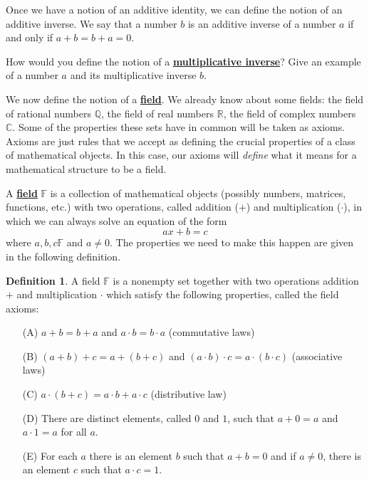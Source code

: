 \documentclass[11pt]{article}
\newenvironment{task}
	{\begin{mdframed}[linecolor=lightgray, linewidth=3pt]\raggedright}
	{\end{mdframed}}
\renewcommand\emph[1]{\underline{\bf{#1}}} %
\theoremstyle{definition}
\newtheorem{definition}[theorem]{Definition}
\begin{document}
Once we have a notion of an additive identity, we can define the notion of an additive inverse. We say that 
a number $b$ is an additive inverse of a number $a$ if and only if $a+b=b+a = 0$. 

\begin{task}
  How would you define the notion of a \emph{multiplicative inverse}? Give an example of a number $a$ and its 
  multiplicative inverse $b$.
\end{task}

We now define the notion of a \emph{field}. We already know about some fields: the field of rational numbers $\mathbb{Q}$, the field of real numbers $\mathbb{R}$, the
field of complex numbers $\mathbb{C}$. Some of the properties these sets have in common will be taken as axioms. Axioms are just rules that we accept as defining
the crucial properties of a class of mathematical objects. In this case, our axioms will \textit{define} what it means for a mathematical structure to be a field.

A \emph{field} $\mathbb{F}$ is a collection of mathematical objects (possibly numbers, matrices, functions, etc.) with two operations, called
addition ($+$) and multiplication ($\cdot$), in which we can always solve an equation of the form
\[ ax + b = c\]
where $a,b,c\mathbb{F}$ and $a \neq 0$. The properties we need to make this happen are given in the following definition.

\begin{definition} A field $\mathbb{F}$ is a nonempty set together with two operations addition $+$ and multiplication $\cdot$ which satisfy the following
  properties, called the field axioms:
  \begin{enumerate}
    \item[(A)] $a+b=b+a$ and $a\cdot b=b\cdot a$ (commutative laws)
    \item[(B)] $(a+b)+c = a + (b+c)$ and $(a\cdot b)\cdot c = a\cdot (b \cdot c)$ (associative laws)
    \item[(C)] $a\cdot (b+c) = a\cdot b + a \cdot c$ (distributive law)
    \item[(D)] There are distinct elements, called $0$ and $1$, such that $a+0 = a $ and $a \cdot 1 = a$ for all $a$.
    \item[(E)] For each $a$ there is an element $b$ such that $a + b = 0$ and if $a\neq 0$, there is an element $c$ such that $a\cdot c = 1$.
  \end{enumerate}
\end{definition}
\end{document}
